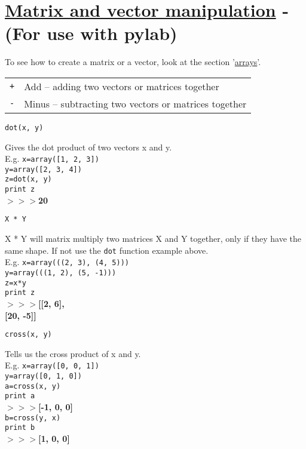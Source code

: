 \section*{\underline{Matrix and vector manipulation}  - ({\color{red}For use with pylab})}
To see how to create a matrix or a vector, look at the section '\hyperlink{arrays}{arrays}'.

\begin{longtable}{l p{11cm}}
\texttt{+}&Add – adding two vectors or matrices together\\[1ex]
\texttt{-}& Minus – subtracting two vectors or matrices together
\end{longtable}

\newpage

\noindent \texttt{dot(x, y)}
\begin{myindentpar}{1.4cm}
\vspace*{-1ex}
Gives the dot product of two vectors x and y.\\
E.g. \texttt{x=array([1, 2, 3])\\
y=array([2, 3, 4])\\
z=dot(x, y)\\
{\color{purple}print} z}\\
\textbf{$>>>$20}
\end{myindentpar}

\noindent \texttt{X * Y}
\begin{myindentpar}{1.4cm}
\vspace*{-1ex}
X * Y will matrix multiply two matrices X and Y together, only if they have the same shape. If not use the \texttt{dot} function example above.\\
E.g. \texttt{x=array(((2, 3), (4, 5)))\\
y=array(((1, 2), (5, -1)))\\
z=x*y\\
{\color{purple}print} z}\\
\textbf{$>>>$[[2, 6],\\ 
\phantom{$>>>$[}[20, -5]]}
\end{myindentpar}

\noindent \texttt{cross(x, y)}
\begin{myindentpar}{1.4cm}
\vspace*{-1ex}
Tells us the cross product of x and y.\\
E.g. \texttt{x=array([0, 0, 1])\\
y=array([0, 1, 0])\\
a=cross(x, y)\\
{\color{purple}print} a}\\
\textbf{$>>>$[-1, 0, 0]}\\
\texttt{b=cross(y, x)\\
{\color{purple}print} b}\\
\textbf{$>>>$[1, 0, 0]}
\end{myindentpar}

